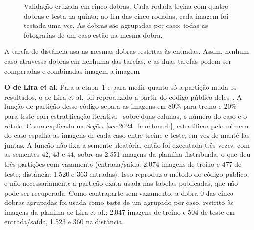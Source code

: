 \begin{figure}[htpb]
\centering
{}
\caption{Validação cruzada em cinco dobras. Cada rodada treina com quatro dobras e testa na quinta; ao fim das cinco rodadas, cada imagem foi testada uma vez. As dobras são agrupadas por caso: todas as fotografias de um caso estão na mesma dobra.}
\label{fig:cinco_dobras}
\end{figure}



A tarefa de distância usa as mesmas dobras restritas às entradas. Assim, nenhum caso atravessa dobras em nenhuma das tarefas, e as duas tarefas podem ser comparadas e combinadas imagem a imagem.

\textbf{O  de Lira et al.}
\label{sec:leak_setup}
Para a etapa~1 e para medir quanto só a partição muda os resultados, o  de Lira et al.\ foi reproduzido a partir do código público deles~\cite{leguwoi}. A função de partição desse código separa as imagens em 80\% para treino e 20\% para teste com estratificação iterativa~\cite{sechidis2011stratification} sobre duas colunas, o número do caso e o rótulo. Como explicado na Seção~\ref{sec:2024_benchmark}, estratificar pelo número do caso espalha as imagens de cada caso entre treino e teste, em vez de mantê-las juntas. A função não fixa a semente aleatória, então foi executada três vezes, com as sementes 42, 43 e 44, sobre as 2.551 imagens da planilha distribuída, o que deu três partições com vazamento (entrada/saída: 2.074 imagens de treino e 477 de teste; distância: 1.520 e 363 entradas). Isso reproduz o método do código público, e não necessariamente a partição exata usada nas tabelas publicadas, que não pode ser recuperada. Como contraparte sem vazamento, a dobra 0 das cinco dobras agrupadas foi usada como teste de um  agrupado por caso, restrito às imagens da planilha de Lira et al.: 2.047 imagens de treino e 504 de teste em entrada/saída, 1.523 e 360 na distância.

